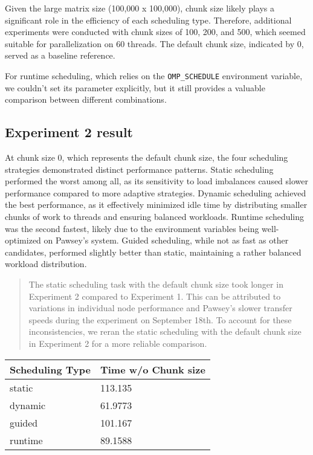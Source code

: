\documentclass[
]{article}
\begin{document}
Given the large matrix size (100,000 x 100,000), chunk size likely plays
a significant role in the efficiency of each scheduling type. Therefore,
additional experiments were conducted with chunk sizes of 100, 200, and
500, which seemed suitable for parallelization on 60 threads. The
default chunk size, indicated by 0, served as a baseline reference.

For runtime scheduling, which relies on the \texttt{OMP\_SCHEDULE}
environment variable, we couldn't set its parameter explicitly, but it
still provides a valuable comparison between different combinations.

\subsection{Experiment 2 result}\label{experiment-2-result}

At chunk size 0, which represents the default chunk size, the four
scheduling strategies demonstrated distinct performance patterns. Static
scheduling performed the worst among all, as its sensitivity to load
imbalances caused slower performance compared to more adaptive
strategies. Dynamic scheduling achieved the best performance, as it
effectively minimized idle time by distributing smaller chunks of work
to threads and ensuring balanced workloads. Runtime scheduling was the
second fastest, likely due to the environment variables being
well-optimized on Pawsey's system. Guided scheduling, while not as fast
as other candidates, performed slightly better than static, maintaining
a rather balanced workload distribution.

\begin{quote}
The static scheduling task with the default chunk size took longer in
Experiment 2 compared to Experiment 1. This can be attributed to
variations in individual node performance and Pawsey's slower transfer
speeds during the experiment on September 18th. To account for these
inconsistencies, we reran the static scheduling with the default chunk
size in Experiment 2 for a more reliable comparison.
\end{quote}

\begin{longtable}[]{@{}ll@{}}
\toprule\noalign{}
Scheduling Type & Time w/o Chunk size \\
\midrule\noalign{}
\endhead
\bottomrule\noalign{}
\endlastfoot
static & 113.135 \\
dynamic & 61.9773 \\
guided & 101.167 \\
runtime & 89.1588 \\
\end{longtable}
\end{document}
